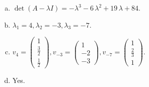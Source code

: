 \begin{questions}
\begin{solution}
\begin{enumerate}[(a)]
\item $\det(A-\lambda I)=-{\lambda}^{3} - 6 \, {\lambda}^{2} + 19 \, {\lambda} + 84$.
\item ${\lambda}_1=4, {\lambda}_2=-3, {\lambda}_3=-7$.
\item $v_{4}=\left(\begin{array}{r}
1 \\
\frac{3}{2} \\
\frac{1}{2}
\end{array}\right), v_{-3}=\left(\begin{array}{r}
1 \\
-2 \\
-3
\end{array}\right), v_{-7}=\left(\begin{array}{r}
1 \\
\frac{2}{3} \\
1
\end{array}\right)$.
\item Yes.
\end{enumerate}
\end{solution}

\end{questions}

\newpage


\begin{center}
\end{center}

